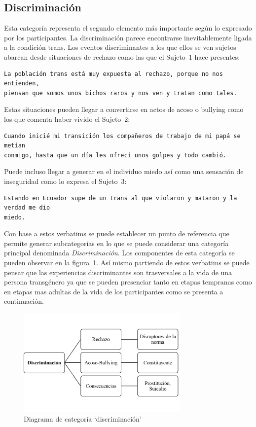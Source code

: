 \subsection{Discriminación}

Esta categoría representa el segundo elemento más importante según lo expresado
por los participantes. La discriminación parece encontrarse inevitablemente
ligada a la condición trans. Los eventos discriminantes a los que ellos se ven
sujetos abarcan desde situaciones de rechazo como las que el Sujeto~1 hace
presentes:

\begin{verbatim}
La población trans está muy expuesta al rechazo, porque no nos entienden,
piensan que somos unos bichos raros y nos ven y tratan como tales.
\end{verbatim}

Estas situaciones pueden llegar a convertirse en actos de acoso o bullying como
los que comenta haber vivido el Sujeto~2:

\begin{verbatim}
Cuando inicié mi transición los compañeros de trabajo de mi papá se metían
conmigo, hasta que un día les ofrecí unos golpes y todo cambió.
\end{verbatim}

 Puede incluso llegar a generar en el individuo miedo así como una sensación de
 inseguridad como lo expresa el Sujeto~3:

 \begin{verbatim}
Estando en Ecuador supe de un trans al que violaron y mataron y la verdad me dio
miedo.
 \end{verbatim}

Con base a estos verbatims se puede establecer un punto de referencia que
permite generar subcategorías en lo que se puede considerar una categoría
principal denominada \emph{Discriminación}. Los componentes de esta categoría se
pueden observar en la figura~\ref{fig:discriminacion}. Así mismo partiendo de
estos verbatims se puede pensar que las experiencias discriminantes son
trasversales a la vida de una persona transgénero ya que se pueden presenciar
tanto en etapas tempranas como en etapas mas adultas de la vida de los
participantes como se presenta a continuación.

\begin{figure}
    \centering
    \includegraphics[width=0.75\textwidth]{discriminacion}
    \caption{Diagrama de categoría ‘discriminación’}\label{fig:discriminacion}
\end{figure}

